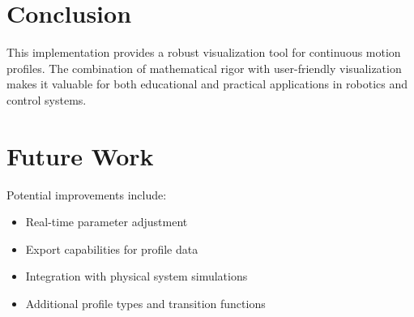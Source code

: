 \documentclass[12pt,a4paper]{article}
\begin{document}
\section{Conclusion}
This implementation provides a robust visualization tool for continuous motion profiles. The combination of mathematical rigor with user-friendly visualization makes it valuable for both educational and practical applications in robotics and control systems.

\section{Future Work}
Potential improvements include:
\begin{itemize}
\item Real-time parameter adjustment
\item Export capabilities for profile data
\item Integration with physical system simulations
\item Additional profile types and transition functions
\end{itemize}
\end{document}
